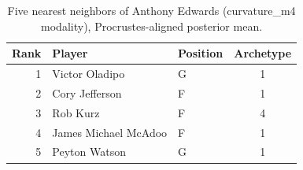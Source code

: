 \begin{table}[htbp]
  \centering\small
  \begin{tabular}{rllc}
    \toprule
    Rank & Player & Position & Archetype \\
    \midrule
    1 & Victor Oladipo & G & 1 \\
    2 & Cory Jefferson & F & 1 \\
    3 & Rob Kurz & F & 4 \\
    4 & James Michael McAdoo & F & 1 \\
    5 & Peyton Watson & G & 1 \\
    \bottomrule
  \end{tabular}
  \caption{Five nearest neighbors of Anthony Edwards (curvature_m4 modality), Procrustes-aligned posterior mean.}
  \label{tab:Anthony_Edwards_neighbors_curvature_m4}
\end{table}

